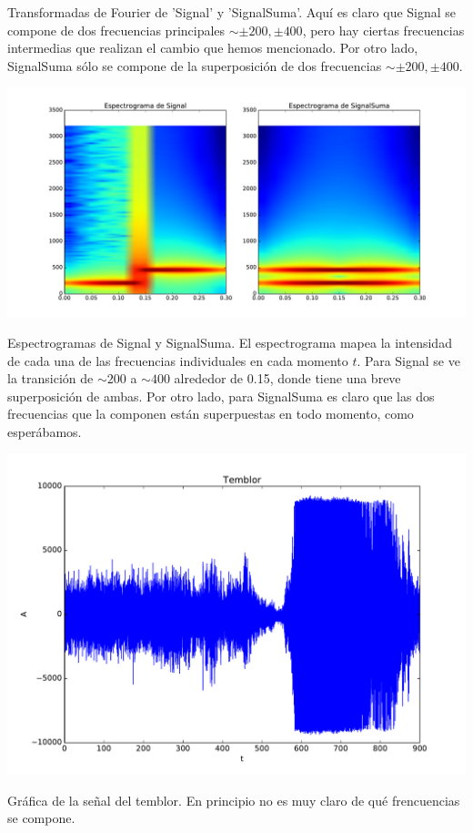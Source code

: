 \documentclass[11pt,letterpaper]{exam}
\begin{document}
{Transformadas de Fourier de 'Signal' y 'SignalSuma'. Aqu\'i es claro que Signal se compone de dos frecuencias principales $\sim \pm 200, \pm 400$, pero hay ciertas frecuencias intermedias que realizan el cambio que hemos mencionado. Por otro lado, SignalSuma sólo se compone de la superposición de dos frecuencias $\sim \pm 200, \pm 400$.}
\begin{center}
\includegraphics[width=14cm]{2_Espectrogramas.pdf} 
\end{center}
{Espectrogramas de Signal y SignalSuma. El espectrograma mapea la intensidad de cada una de las frecuencias individuales en cada momento $t$. Para Signal se ve la transici\'on de $\sim 200$ a $\sim 400$ alrededor de 0.15, donde tiene una breve superposición de ambas. Por otro lado, para SignalSuma es claro que las dos frecuencias que la componen están superpuestas en todo momento, como esper\'abamos.}
\begin{center}
\includegraphics[width=14cm]{2_Temblor.pdf} 
\end{center}
{Gráfica de la señal del temblor. En principio no es muy claro de qué frencuencias se compone.}
\end{document}
